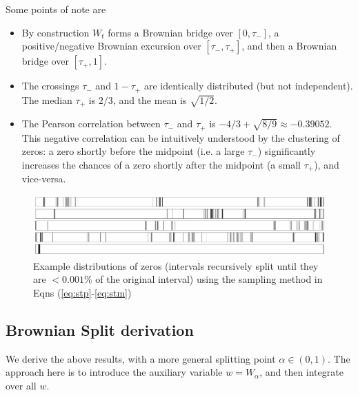 \documentclass{article}
\newcommand{\tm}{{\tau_{\mathrm{-}}}}
\newcommand{\tp}{{\tau_{\mathrm{+}}}}
\begin{document}
Some points of note are
\begin{itemize}
    \item{By construction $W_t$ forms a Brownian bridge over $[0,\tm]$, a positive/negative Brownian excursion over $[\tm,\tp]$, and then a Brownian bridge over $[\tp,1]$.}
    \item{The crossings $\tm$ and $1-\tp$ are identically distributed (but not independent). The median $\tp$ is $2/3$, and the mean is $\sqrt{1/2}$.}
    \item{The Pearson correlation between $\tm$ and $\tp$ is $-4/3 + \sqrt{8/9} \approx -0.39052$. This negative correlation can be intuitively understood by the clustering of zeros: a zero shortly before the midpoint (i.e. a large $\tm$) significantly increases the chances of a zero shortly after the midpoint (a small $\tp$), and vice-versa.}
\end{itemize}

\begin{figure}
\centering
\includegraphics[width=\columnwidth]{figs/sample.png}
\caption{Example distributions of zeros (intervals recursively split until they are $<0.001\%$ of the original interval) using the sampling method in Eqns (\ref{eq:stp}-\ref{eq:stm})}
\end{figure}

\subsection{Brownian Split derivation}
We derive the above results, with a more general splitting point $\alpha \in (0,1)$. The approach here is to introduce the auxiliary variable $w=W_\alpha$, and then integrate over all $w$.
\end{document}
